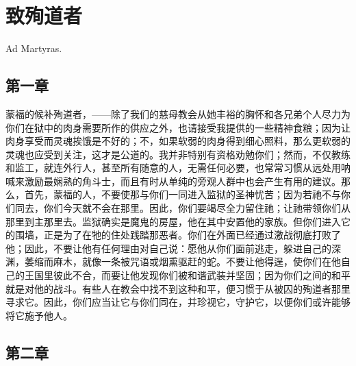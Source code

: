 
\chapter{致殉道者}


Ad Martyras.\par


\section{第一章}

蒙福的候补殉道者，——除了我们的慈母教会从她丰裕的胸怀和各兄弟个人尽力为你们在狱中的肉身需要所作的供应之外，也请接受我提供的一些精神食粮；因为让肉身享受而灵魂挨饿是不好的；不，如果软弱的肉身得到细心照料，那么更软弱的灵魂也应受到关注，这才是公道的。我并非特别有资格劝勉你们；然而，不仅教练和监工，就连外行人，甚至所有随意的人，无需任何必要，也常常习惯从远处用呐喊来激励最娴熟的角斗士，而且有时从单纯的旁观人群中也会产生有用的建议。那么，首先，蒙福的人，不要使那与你们一同进入监狱的圣神忧苦；因为若祂不与你们同去，你们今天就不会在那里。因此，你们要竭尽全力留住祂；让祂带领你们从那里到主那里去。监狱确实是魔鬼的房屋，他在其中安置他的家族。但你们进入它的围墙，正是为了在牠的住处践踏那恶者。你们在外面已经通过激战彻底打败了他；因此，不要让他有任何理由对自己说：愿他从你们面前逃走，躲进自己的深渊，萎缩而麻木，就像一条被咒语或烟熏驱赶的蛇。不要让他得逞，使你们在他自己的王国里彼此不合，而要让他发现你们被和谐武装并坚固；因为你们之间的和平就是对他的战斗。有些人在教会中找不到这种和平，便习惯于从被囚的殉道者那里寻求它。因此，你们应当让它与你们同在，并珍视它，守护它，以便你们或许能够将它施予他人。\par


\section{第二章}

